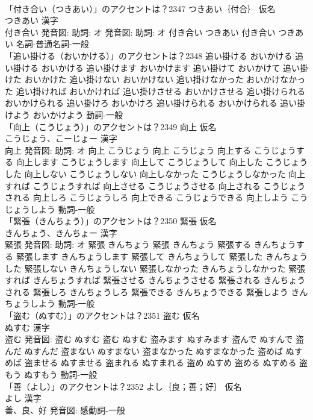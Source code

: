 \documentclass[8pt]{extreport}
\begin{document}
\begin{CJK}{UTF8}{min}
\\	「付き合い（つきあい）」のアクセントは？2347	つきあい｛付合｝ 仮名　
\\	つきあい 漢字　
\\	付き合い 発音図: 助詞: オ 発音図: 助詞: オ	付き合い つきあい		付き合い つきあい				名詞-普通名詞-一般 
\\	「追い掛ける（おいかける）」のアクセントは？2348		追い掛ける おいかける		追い掛ける おいかける 追い掛けます おいかけます 追い掛けて おいかけて 追い掛けた おいかけた 追い掛けない おいかけない 追い掛けなかった おいかけなかった 追い掛ければ おいかければ 追い掛けさせる おいかけさせる 追い掛けられる おいかけられる 追い掛けろ おいかけろ 追い掛けられる おいかけられる 追い掛けよう おいかけよう				動詞-一般 
\\	「向上（こうじょう）」のアクセントは？2349	向上 仮名　
\\	こうじょう、こーじょー 漢字　
\\	向上 発音図: 助詞: オ	向上 こうじょう		向上 こうじょう 向上する こうじょうする 向上します こうじょうします 向上して こうじょうして 向上した こうじょうした 向上しない こうじょうしない 向上しなかった こうじょうしなかった 向上すれば こうじょうすれば 向上させる こうじょうさせる 向上される こうじょうされる 向上しろ こうじょうしろ 向上できる こうじょうできる 向上しよう こうじょうしよう				動詞-一般 
\\	「緊張（きんちょう）」のアクセントは？2350	緊張 仮名　
\\	きんちょう、きんちょー 漢字　
\\	緊張 発音図: 助詞: オ	緊張 きんちょう		緊張 きんちょう 緊張する きんちょうする 緊張します きんちょうします 緊張して きんちょうして 緊張した きんちょうした 緊張しない きんちょうしない 緊張しなかった きんちょうしなかった 緊張すれば きんちょうすれば 緊張させる きんちょうさせる 緊張される きんちょうされる 緊張しろ きんちょうしろ 緊張できる きんちょうできる 緊張しよう きんちょうしよう				動詞-一般 
\\	「盗む（ぬすむ）」のアクセントは？2351	盗む 仮名　
\\	ぬすむ 漢字　
\\	盗む 発音図:	盗む ぬすむ		盗む ぬすむ 盗みます ぬすみます 盗んで ぬすんで 盗んだ ぬすんだ 盗まない ぬすまない 盗まなかった ぬすまなかった 盗めば ぬすめば 盗ませる ぬすませる 盗まれる ぬすまれる 盗め ぬすめ 盗める ぬすめる 盗もう ぬすもう				動詞-一般 
\\	「善（よし）」のアクセントは？2352	よし｛良；善；好｝ 仮名　
\\	よし 漢字　
\\	善、良、好 発音図:							感動詞-一般 

\end{CJK}
\end{document}
